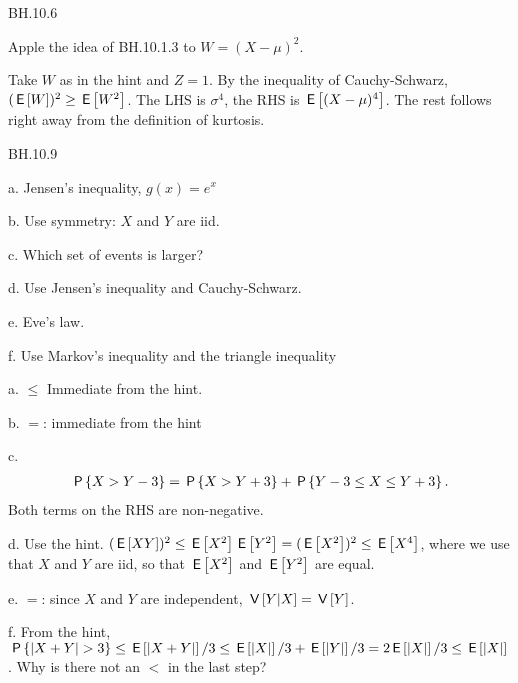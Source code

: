 \begin{exercise}
BH.10.6
\begin{hint}
Apple the idea of BH.10.1.3 to $W=(X-\mu)^2$.
\end{hint}
\begin{solution}
Take $W$ as in the hint and $Z=1$. By the inequality of Cauchy-Schwarz, $(\E{W})^2 \geq \E{W^2}$. The LHS is $\sigma^{4}$, the RHS is $\E{(X-\mu)^4}$. The rest  follows right away from the definition of kurtosis.
\end{solution}
\end{exercise}

\begin{exercise}
BH.10.9
\begin{hint}
a. Jensen's inequality, $g(x)=e^x$

b. Use symmetry: $X$ and $Y$ are iid.

c. Which set of events is larger?

d.
Use Jensen's inequality and Cauchy-Schwarz.

e. Eve's law.

f. Use Markov's inequality and  the triangle inequality
\end{hint}
\begin{solution}
a. $\leq$ Immediate from the hint.

b. $=$: immediate from the hint

c.
\begin{align*}
\P{X>Y-3} =  \P{X>Y+3} + \P{Y-3\leq X \leq Y+3}.
\end{align*}
Both terms on the RHS are non-negative.

d. Use the hint. $(\E{XY})^{2} \leq \E{X^2}\E{Y^2} =(\E{X^2})^{2} \leq \E{X^4}$, where we use that  $X$ and $Y$ are iid, so that $\E{X^2}$ and $\E{Y^2}$ are equal.

e. $=$: since $X$ and $Y$ are independent, $\V{Y|X} = \V Y$.

f. From the hint,  $\P{|X+Y|>3} \leq \E{|X+Y|}/3 \leq \E{|X|}/3 + \E{|Y|}/3 = 2\E{|X|}/3 \leq \E{|X|}$. Why is there not an $<$ in the last step?
\end{solution}
\end{exercise}

